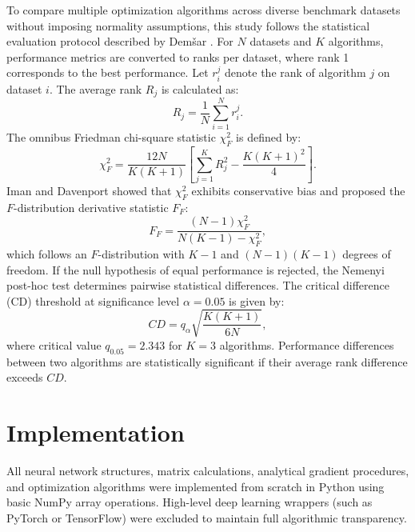 \documentclass[10pt, conference]{IEEEtran}
\begin{document}
To compare multiple optimization algorithms across diverse benchmark datasets without imposing normality assumptions, this study follows the statistical evaluation protocol described by Dem\v{s}ar \cite{demsar2006statistical}. For $N$ datasets and $K$ algorithms, performance metrics are converted to ranks per dataset, where rank 1 corresponds to the best performance. Let $r_i^j$ denote the rank of algorithm $j$ on dataset $i$. The average rank $R_j$ is calculated as:
\begin{equation}
R_j = \frac{1}{N} \sum_{i=1}^N r_i^j.
\end{equation}
The omnibus Friedman chi-square statistic $\chi_F^2$ is defined by:
\begin{equation}
\chi_F^2 = \frac{12 N}{K(K+1)} \left[ \sum_{j=1}^K R_j^2 - \frac{K(K+1)^2}{4} \right].
\end{equation}
Iman and Davenport showed that $\chi_F^2$ exhibits conservative bias and proposed the $F$-distribution derivative statistic $F_F$:
\begin{equation}
F_F = \frac{(N - 1) \chi_F^2}{N(K - 1) - \chi_F^2},
\end{equation}
which follows an $F$-distribution with $K-1$ and $(N-1)(K-1)$ degrees of freedom. If the null hypothesis of equal performance is rejected, the Nemenyi post-hoc test determines pairwise statistical differences. The critical difference (CD) threshold at significance level $\alpha = 0.05$ is given by:
\begin{equation}
CD = q_{\alpha} \sqrt{\frac{K(K+1)}{6 N}},
\end{equation}
where critical value $q_{0.05} = 2.343$ for $K = 3$ algorithms. Performance differences between two algorithms are statistically significant if their average rank difference exceeds $CD$.

\section{Implementation}

All neural network structures, matrix calculations, analytical gradient procedures, and optimization algorithms were implemented from scratch in Python using basic NumPy array operations. High-level deep learning wrappers (such as PyTorch or TensorFlow) were excluded to maintain full algorithmic transparency.
\end{document}
